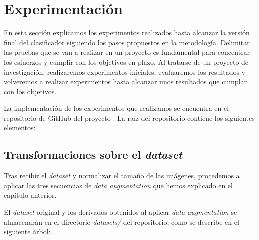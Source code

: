 \chapter{Experimentación}
En esta sección explicamos los experimentos realizados hasta alcanzar la versión final del clasificador siguiendo los pasos propuestos en la metodología. Delimitar las pruebas que se van a realizar en un proyecto es fundamental para concentrar los esfuerzos y cumplir con los objetivos en plazo. Al tratarse de un proyecto de investigación, realizaremos experimentos iniciales, evaluaremos los resultados y volveremos a realizar experimentos hasta alcanzar unos resultados que cumplan con los objetivos.

La implementación de los experimentos que realizamos se encuentra en el repositorio de GitHub del proyecto \cite{repository}. La raíz del repositorio contiene los siguientes elementos:


\newpage
\section{Transformaciones sobre el \textit{dataset}}
Tras recibir el \textit{dataset} y normalizar el tamaño de las imágenes, procedemos a aplicar las tres secuencias de \textit{data augmentation} que hemos explicado en el capítulo anterior.

El \textit{dataset} original y los derivados obtenidos al aplicar \textit{data augmentation} se almacenarán en el directorio \textit{datasets/} del repositorio, como se describe en el siguiente árbol:

\vspace{0.2cm}

